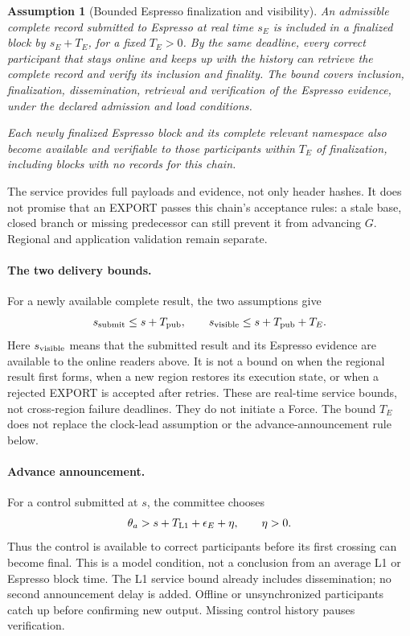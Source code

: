 \documentclass[11pt,a4paper]{article}
\newtheorem{assumption}[assumption]{Assumption}
\begin{document}
\begin{assumption}[Bounded Espresso finalization and visibility]
\label{ass:espresso-visibility}
An admissible complete record submitted to Espresso at real time $s_E$
is included in a finalized block by $s_E+T_E$, for a fixed $T_E>0$.
By the same deadline, every
correct participant that stays online and keeps up with the history can
retrieve the complete record and verify its inclusion and finality.
The bound covers inclusion, finalization, dissemination, retrieval and
verification of the Espresso evidence, under the declared admission and
load conditions.

Each newly finalized Espresso block and its complete relevant namespace
also become available and verifiable to those participants within $T_E$
of finalization, including blocks with no records for this chain.
\end{assumption}
The service provides full payloads and evidence, not only header hashes.
It does not promise that an EXPORT passes this chain's acceptance rules:
a stale base, closed branch or missing predecessor can still prevent it
from advancing $G$. Regional and application validation remain separate.

\paragraph{The two delivery bounds.}
For a newly available complete result, the two assumptions give
\[
 s_{\rm submit}\le s+T_{\rm pub},\qquad
 s_{\rm visible}\le s+T_{\rm pub}+T_E.
\]
Here $s_{\rm visible}$ means that the submitted result and its Espresso
evidence are available to the online readers above. It is not a bound on
when the regional result first forms, when a new region restores its
execution state, or when a rejected EXPORT is accepted after retries.
These are real-time service bounds, not cross-region failure deadlines.
They do not initiate a Force. The bound $T_E$ does not replace the
clock-lead assumption or the advance-announcement rule below.


\paragraph{Advance announcement.}
For a control submitted at $s$, the committee chooses
\[
 \theta_a>s+T_{\rm L1}+\epsilon_E+\eta,
 \qquad \eta>0.
\]
Thus the control is available to correct participants before its
first crossing can become final. This is a model condition, not a
conclusion from an average L1 or Espresso block time. The L1 service
bound already includes dissemination; no second announcement delay is
added. Offline or unsynchronized participants catch up before confirming
new output. Missing control history pauses verification.
\end{document}

